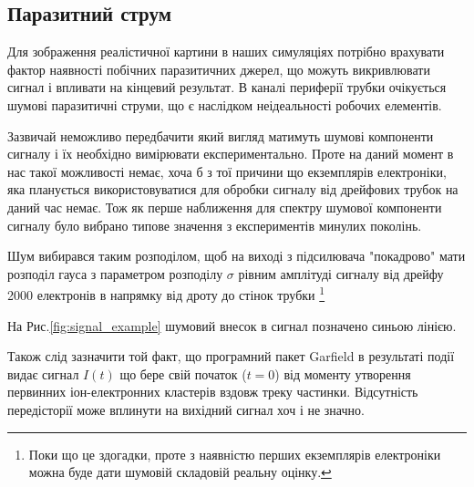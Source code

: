 \documentclass[pdftex,14pt]{scrartcl}
\begin{document}
			
	
	\subsection{Паразитний струм}
	
	Для зображення реалістичної картини в наших симуляціях потрібно врахувати фактор наявності побічних паразитичних джерел, що можуть викривлювати сигнал і впливати на кінцевий результат.
	В каналі периферії трубки очікується шумові паразитичні струми, що є наслідком неідеальності робочих елементів. 
	
	Зазвичай неможливо передбачити який вигляд матимуть шумові компоненти сигналу і їх необхідно вимірювати експериментально. Проте на даний момент в нас такої можливості немає, хоча б з тої причини що екземплярів електроніки, яка планується використовуватися для обробки сигналу від дрейфових трубок на даний час немає. Тож як перше наближення для спектру шумової компоненти сигналу було вибрано типове значення з експериментів минулих поколінь.
	
	Шум вибирався таким розподілом, щоб на виході з підсилювача "покадрово" мати розподіл гауса з параметром розподілу $\sigma$ рівним амплітуді сигналу від дрейфу 2000 електронів в напрямку від дроту до стінок трубки \footnote{ Поки що це здогадки, проте з наявністю перших екземплярів електроніки можна буде дати шумовій складовій реальну оцінку.}
	
	На Рис.\ref{fig:signal_example} шумовий внесок в сигнал позначено синьою лінією.
	
	Також слід зазначити той факт, що програмний пакет Garfield в результаті події видає сигнал $I(t)$ що бере свій початок ($t=0$) від моменту утворення первинних іон-електронних кластерів вздовж треку частинки. Відсутність передісторії може вплинути на вихідний сигнал хоч і не значно.
		
	
		
\end{document}
